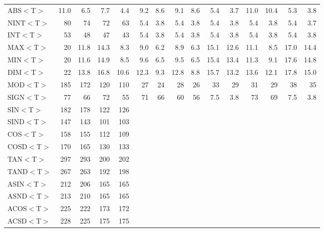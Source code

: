 \documentclass[11pt,nolof]{starlink}
\begin{document}
\begin{table}[h]
\begin{center}
\begin{scriptsize}
\begin{tabular}{|l|r|r||r|r||r|r||r|r||r|r||r|r||r|r|}
ABS$<$T$>$ & 11.0 &  6.5 &  7.7 &  4.4 &  9.2 &  8.6 &  9.1 &  8.6 &  5.4 &  3.7 & 11.0 & 10.4 &  5.3 &  3.8 \\
NINT$<$T$>$ &   80 &   74 &   72 &   63 &  5.4 &  3.8 &  5.4 &  3.8 &  5.4 &  3.8 &  5.4 &  3.8 &  5.4 &  3.7 \\
INT$<$T$>$ &   53 &   48 &   47 &   43 &  5.4 &  3.8 &  5.4 &  3.8 &  5.4 &  3.8 &  5.4 &  3.8 &  5.4 &  3.8 \\
MAX$<$T$>$ &   20 & 11.8 & 14.3 &  8.3 &  9.0 &  6.2 &  8.9 &  6.3 & 15.1 & 12.6 & 11.1 &  8.5 & 17.0 & 14.4 \\
MIN$<$T$>$ &   20 & 11.6 & 14.9 &  8.5 &  9.6 &  6.5 &  9.5 &  6.5 & 15.4 & 13.4 & 11.3 &  9.1 & 17.6 & 14.8 \\
DIM$<$T$>$ &   22 & 13.8 & 16.8 & 10.6 & 12.3 &  9.3 & 12.8 &  8.8 & 15.7 & 13.2 & 13.6 & 12.1 & 17.8 & 15.0 \\
MOD$<$T$>$ &  185 &  172 &  120 &  110 &   27 &   24 &   28 &   26 &   33 &   29 &   31 &   29 &   38 &   35 \\
SIGN$<$T$>$ &   77 &   66 &   72 &   55 &   71 &   66 &   60 &   56 &  7.5 &  3.8 &   73 &   69 &  7.5 &  3.8 \\
SIN$<$T$>$ &  182 &  178 &  122 &  126 &      &      &      &      &      &      &      &      &      &      \\
SIND$<$T$>$ &  147 &  143 &  101 &  103 &      &      &      &      &      &      &      &      &      &      \\
COS$<$T$>$ &  158 &  155 &  112 &  109 &      &      &      &      &      &      &      &      &      &      \\
COSD$<$T$>$ &  170 &  165 &  130 &  133 &      &      &      &      &      &      &      &      &      &      \\
TAN$<$T$>$ &  297 &  293 &  200 &  202 &      &      &      &      &      &      &      &      &      &      \\
TAND$<$T$>$ &  267 &  263 &  192 &  198 &      &      &      &      &      &      &      &      &      &      \\
ASIN$<$T$>$ &  212 &  206 &  165 &  165 &      &      &      &      &      &      &      &      &      &      \\
ASND$<$T$>$ &  213 &  210 &  165 &  165 &      &      &      &      &      &      &      &      &      &      \\
ACOS$<$T$>$ &  225 &  222 &  173 &  172 &      &      &      &      &      &      &      &      &      &      \\
ACSD$<$T$>$ &  228 &  225 &  175 &  175 &      &      &      &      &      &      &      &      &      &      \\

\end{tabular}
\end{scriptsize}
\end{center}
\end{table}
\end{document}
